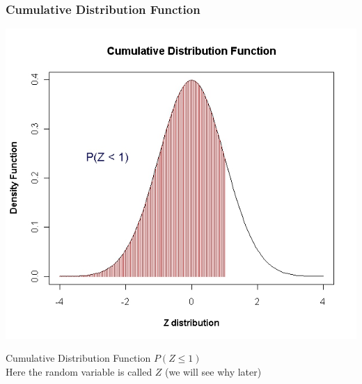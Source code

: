 \frametitle{Cumulative Distribution Function}
\vspace{-0.5cm}
\begin{center}
\includegraphics[scale=0.35]{6ACDF}
\end{center}
Cumulative Distribution Function $P(Z \leq 1)$ \\ Here the random variable is called $Z$ (we will see why later)
\smallskip 



 